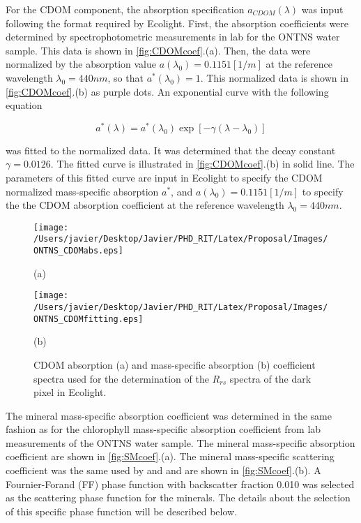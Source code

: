 \documentclass[onecolumn,3p]{elsarticle}
\begin{document}
For the CDOM component, the absorption specification $a_{CDOM}(\lambda)$ was input following the format required by Ecolight. First, the absorption coefficients were determined by spectrophotometric measurements in lab for the ONTNS water sample. This data is shown in \autoref{fig:CDOMcoef}.(a). Then, the data were normalized by the absorption value $a(\lambda_0)=0.1151[1/m]$ at the reference wavelength $\lambda_0=440nm$, so that $a^*(\lambda_0)=1$. This normalized data is shown in \autoref{fig:CDOMcoef}.(b) as purple dots. An exponential curve with the following equation

\begin{equation}
	\label{eq:CDOMabs}
	a^*(\lambda)=a^*(\lambda_0)\exp{\left[-\gamma(\lambda-\lambda_0)\right]}
\end{equation}

\noindent was fitted to the normalized data. It was determined that the decay constant $\gamma=0.0126$. The fitted curve is illustrated in \autoref{fig:CDOMcoef}.(b) in solid line. The parameters of this fitted curve are input in Ecolight to specify the CDOM normalized mass-specific absorption $a^*$, and $a(\lambda_0)=0.1151[1/m]$ to specify the the CDOM absorption coefficient at the reference wavelength $\lambda_0=440nm$.

\begin{figure}[!ht]
	\begin{minipage}[c]{0.48\linewidth}
  		\centering
  		\texttt{[image: /Users/javier/Desktop/Javier/PHD\_RIT/Latex/Proposal/Images/ONTNS\_CDOMabs.eps]}
		\centerline{(a)}\medskip
  	\end{minipage}  
  	\hfill
  	\begin{minipage}[c]{0.48\linewidth}
    	\centering
  		\texttt{[image: /Users/javier/Desktop/Javier/PHD\_RIT/Latex/Proposal/Images/ONTNS\_CDOMfitting.eps]}
  		\centerline{(b)}\medskip
  	\end{minipage}  
  	\caption{CDOM absorption (a) and mass-specific absorption (b) coefficient spectra used for the determination of the $R_{rs}$ spectra of the dark pixel in Ecolight. \label{fig:CDOMcoef} }
\end{figure}

The mineral mass-specific absorption coefficient was determined in the same fashion as for the chlorophyll mass-specific absorption coefficient from lab measurements of the ONTNS water sample. The mineral mass-specific absorption coefficient are shown in \autoref{fig:SMcoef}.(a). The mineral mass-specific scattering coefficient was the same used by \cite{Raqueno:2000} and \cite{Raqueno:2003} and are shown in \autoref{fig:SMcoef}.(b). A Fournier-Forand (FF) phase function with backscatter fraction 0.010 was selected as the scattering phase function for the minerals. The details about the selection of this specific phase function will be described below.
\end{document}
